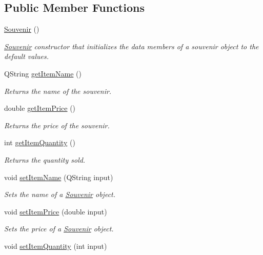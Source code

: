 \subsection*{Public Member Functions}
\begin{DoxyCompactItemize}
\item 
\hyperlink{class_souvenir_a1c80e600047ec0e9cc064cf78c79b630}{Souvenir} ()
\begin{DoxyCompactList}\small\item\em \hyperlink{class_souvenir}{Souvenir} constructor that initializes the data members of a souvenir object to the default values. \end{DoxyCompactList}\item 
Q\+String \hyperlink{class_souvenir_a647d7608865447766758aed5d400fe0d}{get\+Item\+Name} ()
\begin{DoxyCompactList}\small\item\em Returns the name of the souvenir. \end{DoxyCompactList}\item 
double \hyperlink{class_souvenir_a8d88c94653047ed0d35141c3b465eae3}{get\+Item\+Price} ()
\begin{DoxyCompactList}\small\item\em Returns the price of the souvenir. \end{DoxyCompactList}\item 
int \hyperlink{class_souvenir_a81daf860165ee3d675782a8039de2217}{get\+Item\+Quantity} ()
\begin{DoxyCompactList}\small\item\em Returns the quantity sold. \end{DoxyCompactList}\item 
void \hyperlink{class_souvenir_a8d1cd526ab97dc2c708adaddeaa4e84a}{set\+Item\+Name} (Q\+String input)
\begin{DoxyCompactList}\small\item\em Sets the name of a \hyperlink{class_souvenir}{Souvenir} object. \end{DoxyCompactList}\item 
void \hyperlink{class_souvenir_ac64dead1ef1668fabd93c4bf5ca11a56}{set\+Item\+Price} (double input)
\begin{DoxyCompactList}\small\item\em Sets the price of a \hyperlink{class_souvenir}{Souvenir} object. \end{DoxyCompactList}\item 
void \hyperlink{class_souvenir_a058a2d7d29ff07c14753f33f2a344b9a}{set\+Item\+Quantity} (int input)

\end{DoxyCompactItemize}
